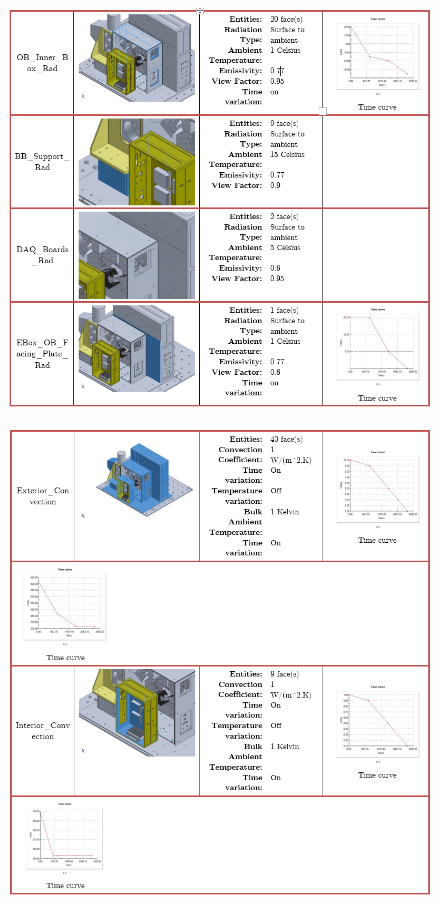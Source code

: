 \begin{figure}
    \centering
    \includegraphics[width=\textwidth]{thermal_load_images/ascent_pt1_TL_images/ascesnt_pt1_7.PNG}
\end{figure}

\begin{figure}
    \centering
    \includegraphics[width=\textwidth]{thermal_load_images/ascent_pt1_TL_images/ascesnt_pt1_8.PNG}
\end{figure}


